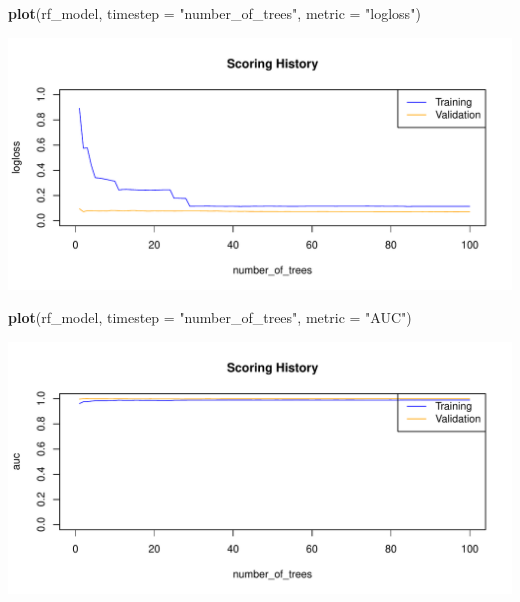 \documentclass[]{article}
\newenvironment{Shaded}{\begin{snugshade}}{\end{snugshade}}
\newcommand{\KeywordTok}[1]{\textcolor[rgb]{0.13,0.29,0.53}{\textbf{{#1}}}}
\newcommand{\DataTypeTok}[1]{\textcolor[rgb]{0.13,0.29,0.53}{{#1}}}
\newcommand{\StringTok}[1]{\textcolor[rgb]{0.31,0.60,0.02}{{#1}}}
\newcommand{\NormalTok}[1]{{#1}}
\begin{document}
\begin{Shaded}
\begin{Highlighting}[]
\KeywordTok{plot}\NormalTok{(rf_model,}
     \DataTypeTok{timestep =} \StringTok{"number_of_trees"}\NormalTok{,}
     \DataTypeTok{metric =} \StringTok{"logloss"}\NormalTok{)}
\end{Highlighting}
\end{Shaded}

\begin{center}\includegraphics{webinar_code_files/figure-latex/unnamed-chunk-54-1} \end{center}

\begin{Shaded}
\begin{Highlighting}[]
\KeywordTok{plot}\NormalTok{(rf_model,}
     \DataTypeTok{timestep =} \StringTok{"number_of_trees"}\NormalTok{,}
     \DataTypeTok{metric =} \StringTok{"AUC"}\NormalTok{)}
\end{Highlighting}
\end{Shaded}

\begin{center}\includegraphics{webinar_code_files/figure-latex/unnamed-chunk-55-1} \end{center}
\end{document}
